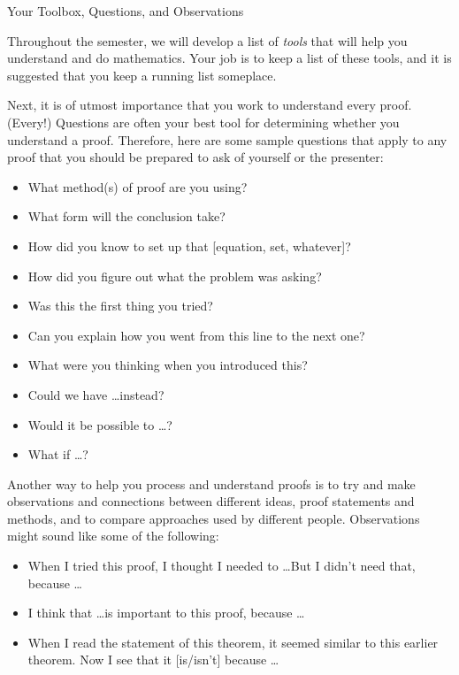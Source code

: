 \begin{section}{Your Toolbox, Questions, and Observations}

Throughout the semester, we will develop a list of \emph{tools} that will help you understand and do mathematics. Your job is to keep a list of these tools, and it is suggested that you keep a running list someplace.

Next, it is of utmost importance that you work to understand every proof. (Every!)  Questions are often your best tool for determining whether you understand a proof.  Therefore, here are some sample questions that apply to any proof that you should be prepared to ask of yourself or the presenter:
\begin{itemize}
\item What method(s) of proof are you using?
\item What form will the conclusion take?
\item How did you know to set up that [equation, set, whatever]?
\item How did you figure out what the problem was asking?
\item Was this the first thing you tried?
\item Can you explain how you went from this line to the next one?
\item What were you thinking when you introduced this?
\item Could we have \ldots instead?
\item Would it be possible to \ldots?
\item What if \ldots?
\end{itemize}

Another way to help you process and understand proofs is to try and make observations and connections between different ideas, proof statements and methods, and to compare approaches used by different people. Observations might sound like some of the following:
\begin{itemize}
\item When I tried this proof, I thought I needed to \ldots But I didn't need that, because \ldots
\item I think that \ldots is important to this proof, because \ldots
\item When I read the statement of this theorem, it seemed similar to this earlier theorem. Now I see that it [is/isn't] because \ldots
\end{itemize}

\end{section}

